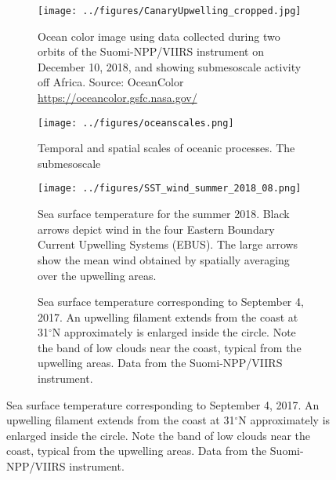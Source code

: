 \documentclass[final,table,svgnames]{article}
\begin{document}
\pagestyle{empty}

\begin{figure}

\begin{subfigure}[t]{.35\textwidth}
\caption{Ocean color image using data collected during two orbits of the Suomi-NPP/VIIRS instrument on December 10, 2018, and showing submesoscale activity off Africa. Source: OceanColor \url{https://oceancolor.gsfc.nasa.gov/}}
\texttt{[image: ../figures/CanaryUpwelling\_cropped.jpg]}
\end{subfigure}\hspace{1cm}
\begin{subfigure}[t]{.4\textwidth}
\caption{Temporal and spatial scales of oceanic processes. The submesoscale }
\texttt{[image: ../figures/oceanscales.png]}
\end{subfigure}

\begin{subfigure}[b]{.85\textwidth}
\caption{Sea surface temperature for the summer 2018. Black arrows depict wind in the four Eastern Boundary Current Upwelling Systems (EBUS). The large arrows show the mean wind obtained by spatially averaging over the upwelling areas.}
\texttt{[image: ../figures/SST\_wind\_summer\_2018\_08.png]}
\end{subfigure}

\begin{subfigure}[b]{.8\textwidth}
\caption{Sea surface temperature corresponding to September 4, 2017. An upwelling filament extends from the coast at 31$^{\circ}$N approximately is enlarged inside the circle. Note the band of low clouds near the coast, typical from the upwelling areas. Data from the Suomi-NPP/VIIRS instrument.}
\end{subfigure}
\end{figure}
\end{document}
